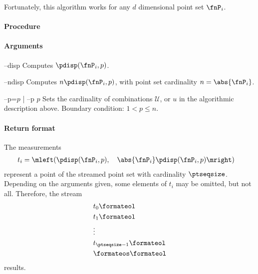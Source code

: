 Fortunately, this algorithm works for any $d$ dimensional point set $\fnP_i$.

\paragraph{Procedure}

\begin{synopsis}
\end{synopsis}

\paragraph{Arguments}

\procarginseq{\ptseqsize}

\procargout

\begin{procarg}{--disp}
  Computes $\pdisp(\fnP_i, p)$.
\end{procarg}

\begin{procarg}{--ndisp}
  Computes $n \pdisp(\fnP_i, p)$, with point set cardinality $n=\abs{\fnP_i}$.
\end{procarg}

\begin{procarg}{--p=$p$ | --p $p$}
  Sets the cardinality of combinations $\mathcal U$, or $u$ in the algorithmic description above. Boundary condition: $1 < p \leq n$.
\end{procarg}

\procargsilent

\paragraph{Return format}

The measurements
\begin{align*}
  t_i &= \mleft( \pdisp(\fnP_i, p),\quad \abs{\fnP_i} \pdisp(\fnP_i, p) \mright)
\end{align*}
represent a point of the streamed point set with cardinality $\ptseqsize$. Depending on the arguments given, some elements of $t_i$ may be omitted, but not all. Therefore, the stream 
\begin{align*}
  &t_0\formateol\\
  &t_1\formateol\\
  &\vdots \\
  &t_{\ptseqsize-1}\formateol\\
  &\formateos\formateol
\end{align*}
results.

